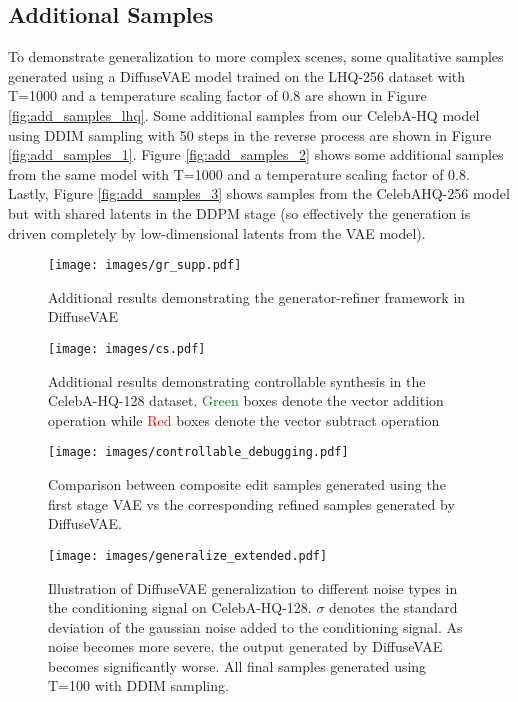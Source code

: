 \documentclass[10pt]{article} \usepackage[accepted]{tmlr}
\begin{document}
\subsection{Additional Samples}
To demonstrate generalization to more complex scenes, some qualitative samples generated using a DiffuseVAE model trained on the LHQ-256 dataset with T=1000 and a temperature scaling factor of 0.8 are shown in Figure \ref{fig:add_samples_lhq}.
Some additional samples from our CelebA-HQ model using DDIM sampling with 50 steps in the reverse process are shown in Figure \ref{fig:add_samples_1}. Figure \ref{fig:add_samples_2} shows some additional samples from the same model with T=1000 and a temperature scaling factor of 0.8. Lastly, Figure \ref{fig:add_samples_3} shows samples from the CelebAHQ-256 model but with shared latents in the DDPM stage (so effectively the generation is driven completely by low-dimensional latents from the VAE model).
\clearpage

\begin{figure*}
  \centering
    \texttt{[image: images/gr\_supp.pdf]}
    \caption{Additional results demonstrating the generator-refiner framework in DiffuseVAE}
    \label{fig:gr_add}
\end{figure*}

\begin{figure*}
  \centering
    \texttt{[image: images/cs.pdf]}
    \caption{Additional results demonstrating controllable synthesis in the CelebA-HQ-128 dataset. \textcolor{green}{Green} boxes denote the vector addition operation while \textcolor{red}{Red} boxes denote the vector subtract operation}
    \label{fig:controllable_add}
\end{figure*}

\begin{figure*}
  \centering
    \texttt{[image: images/controllable\_debugging.pdf]}
    \caption{Comparison between composite edit samples generated using the first stage VAE vs the corresponding refined samples generated by DiffuseVAE.}
    \label{fig:cs_debug}
\end{figure*}

\begin{figure*}[t]
  \centering
    \texttt{[image: images/generalize\_extended.pdf]}
    \caption{Illustration of DiffuseVAE generalization to different noise types in the conditioning signal on CelebA-HQ-128. $\sigma$ denotes the standard deviation of the gaussian noise added to the conditioning signal. As noise becomes more severe, the output generated by DiffuseVAE becomes significantly worse. All final samples generated using T=100 with DDIM sampling.}
    \label{fig:generalize_extended}
\end{figure*}
\end{document}
